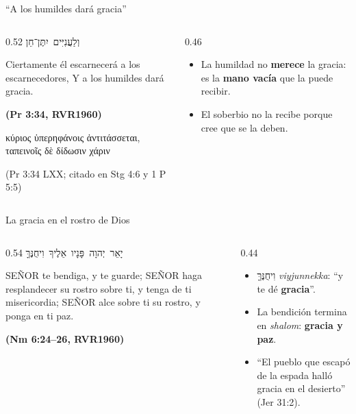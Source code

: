 \documentclass[hyperref={bookmarks=false},aspectratio=169]{beamer}
\newcommand{\heb}[1]{\mbox{\foreignlanguage{hebrew}{#1}}}
\newcommand{\grc}[1]{\foreignlanguage{ancientgreek}{#1}}
\newcommand{\SENOR}{S{\fontsize{0.78em}{1em}\selectfont EÑOR}}
\newcommand{\fuente}[1]{\par\hfill{\upshape\bfseries\footnotesize\textcolor{azul}{#1}}}
\newcommand{\destacar}[1]{\textbf{\textcolor{azul}{#1}}}
\begin{document}
\begin{frame}{``A los humildes dará gracia''}
\begin{columns}[c,onlytextwidth]
\begin{column}{0.52\textwidth}
\centering\heb{וְלַעֲנִיִּים יִתֶּן־חֵן}
\begin{cita}Ciertamente él escarnecerá a los escarnecedores, Y a los humildes dará gracia.\fuente{(Pr 3:34, RVR1960)}\end{cita}
\centering\grc{κύριος ὑπερηφάνοις ἀντιτάσσεται, ταπεινοῖς δὲ δίδωσιν χάριν}\par
{\scriptsize\color{gris}(Pr 3:34 LXX; citado en Stg 4:6 y 1 P 5:5)}
\end{column}
\begin{column}{0.46\textwidth}\small\RaggedRight
\begin{itemize}
\item La humildad no \destacar{merece} la gracia: es la \destacar{mano vacía} que la puede recibir.
\item El soberbio no la recibe porque cree que se la deben.
\end{itemize}
\end{column}
\end{columns}
\end{frame}

\begin{frame}{La gracia en el rostro de Dios}
\begin{columns}[c,onlytextwidth]
\begin{column}{0.54\textwidth}
\centering\heb{יָאֵר יְהוָה פָּנָיו אֵלֶיךָ וִיחֻנֶּךָּ}
\begin{cita}\SENOR{} te bendiga, y te guarde; \SENOR{} haga resplandecer su rostro sobre ti, y tenga de ti misericordia; \SENOR{} alce sobre ti su rostro, y ponga en ti paz.\fuente{(Nm 6:24--26, RVR1960)}\end{cita}
\end{column}
\begin{column}{0.44\textwidth}\small\RaggedRight
\begin{itemize}
\item \heb{וִיחֻנֶּךָּ} \emph{viyjunnekka}: ``y te dé \destacar{gracia}''.
\item La bendición termina en \emph{shalom}: \destacar{gracia y paz}.
\item ``El pueblo que escapó de la espada halló gracia en el desierto'' (Jer 31:2).
\end{itemize}
\end{column}
\end{columns}
\end{frame}
\end{document}
